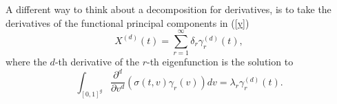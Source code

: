A different way to think about a decomposition for derivatives, is to take the derivatives of the functional principal components in (\ref{y}) %
\begin{equation}\label{der2}
X^{(d)}(t) =  \sum_{r=1}^\infty \delta_{r}  \gamma^{(d)}_r(t),
\end{equation}
where the $d$-th derivative of the $r$-th eigenfunction is the solution to %
\begin{equation}\label{pder2}
 \int_{[0,1]^g} \frac{\partial^{d}}{\partial v^{d}}\left( \sigma(t,v)\gamma_r(v)\right) dv = \lambda_r \gamma^{(d)} _r(t). 
\end{equation}



